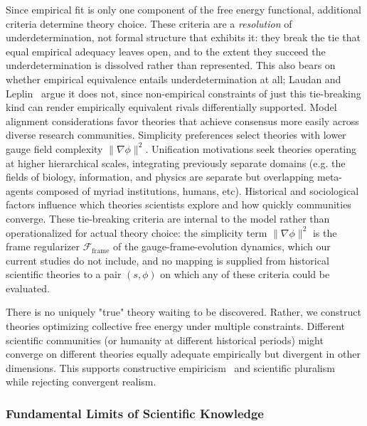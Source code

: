 \documentclass[11pt]{article}
\begin{document}
Since empirical fit is only one component of the free energy functional, additional criteria determine theory choice. These criteria are a \emph{resolution} of underdetermination, not formal structure that exhibits it: they break the tie that equal empirical adequacy leaves open, and to the extent they succeed the underdetermination is dissolved rather than represented. This also bears on whether empirical equivalence entails underdetermination at all; Laudan and Leplin~\cite{LaudanLeplin1991} argue it does not, since non-empirical constraints of just this tie-breaking kind can render empirically equivalent rivals differentially supported. Model alignment considerations favor theories that achieve consensus more easily across diverse research communities. Simplicity preferences select theories with lower gauge field complexity $\|\nabla\phi\|^2$.  Unification motivations seek theories operating at higher hierarchical scales, integrating previously separate domains (e.g. the fields of biology, information, and physics are separate but overlapping meta-agents composed of myriad institutions, humans, etc). Historical and sociological factors influence which theories scientists explore and how quickly communities converge. These tie-breaking criteria are internal to the model rather than operationalized for actual theory choice: the simplicity term $\|\nabla\phi\|^2$ is the frame regularizer $\mathcal{F}_{\text{frame}}$ of the gauge-frame-evolution dynamics, which our current studies do not include, and no mapping is supplied from historical scientific theories to a pair $(s, \phi)$ on which any of these criteria could be evaluated.

There is no uniquely "true" theory waiting to be discovered. Rather, we construct theories optimizing collective free energy under multiple constraints. Different scientific communities (or humanity at different historical periods) might converge on different theories equally adequate empirically but divergent in other dimensions. This supports constructive empiricism~\cite{vanFraassen1980} and scientific pluralism~\cite{Longino2002} while rejecting convergent realism.

\subsubsection{Fundamental Limits of Scientific Knowledge}
\end{document}
